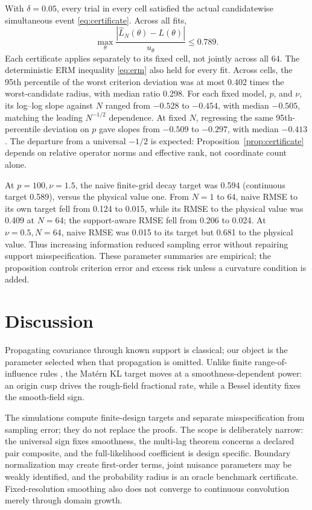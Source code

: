 \documentclass[sigconf]{acmart}
\theoremstyle{remark}
\begin{document}
With \(\delta=0.05\), every trial in every cell satisfied the actual
candidatewise simultaneous event \eqref{eq:certificate}. Across all fits,
\[
 \max_\theta
 \frac{|\widehat L_N(\theta)-L(\theta)|}{u_\theta}\leq 0.789.
\]
Each certificate applies separately to its fixed cell, not jointly across all
64. The deterministic ERM inequality \eqref{eq:erm} also held for every fit.
Across cells, the 95th percentile of the worst criterion deviation was at most
0.402 times the worst-candidate radius, with median ratio 0.298.
For each fixed model, \(p\), and \(\nu\), its log--log slope against \(N\)
ranged from \(-0.528\) to \(-0.454\), with median \(-0.505\), matching the
leading \(N^{-1/2}\) dependence.
At fixed \(N\), regressing the same 95th-percentile deviation on \(p\) gave
slopes from \(-0.509\) to \(-0.297\), with median \(-0.413\). The departure
from a universal \(-1/2\) is expected: Proposition~\ref{prop:certificate}
depends on relative operator norms and effective rank, not coordinate count
alone.

At \(p=100,\nu=1.5\), the naive finite-grid decay target was 0.594
(continuous target 0.589), versus the physical value one. From \(N=1\) to 64,
naive RMSE to its own target fell from 0.124 to 0.015, while its RMSE to the
physical value was 0.409 at \(N=64\); the support-aware RMSE fell from 0.206
to 0.024. At \(\nu=0.5,N=64\), naive RMSE was 0.015 to its target but 0.681
to the physical value. Thus increasing information reduced sampling error
without repairing support misspecification. These parameter summaries are
empirical; the proposition controls criterion error and excess risk unless a
curvature condition is added.

\section{Discussion}

Propagating covariance through known support is classical; our object is the
parameter selected when that propagation is omitted. Unlike finite
range-of-influence rules \cite{clark1977regularization}, the Matérn KL target
moves at a smoothness-dependent power: an origin cusp drives the rough-field
fractional rate, while a Bessel identity fixes the smooth-field sign.

The simulations compute finite-design targets and separate misspecification
from sampling error; they do not replace the proofs. The scope is deliberately
narrow: the universal sign fixes smoothness, the multi-lag theorem concerns a
declared pair composite, and the full-likelihood coefficient is design
specific. Boundary normalization may create first-order terms, joint nuisance
parameters may be weakly identified, and the probability radius is an oracle
benchmark certificate. Fixed-resolution smoothing also does not converge to
continuous convolution merely through domain growth.
\end{document}
